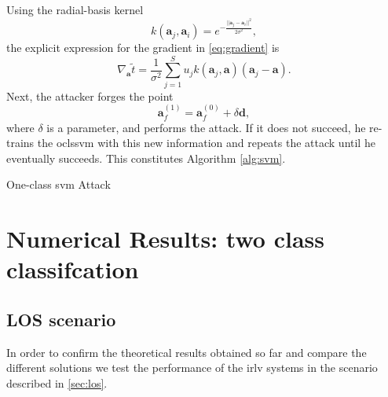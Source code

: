 \documentclass[draftcls,onecolumn,12pt]{IEEEtran}
\begin{document}
Using the radial-basis kernel
\begin{equation}
k(\mathbf{a}_j,\mathbf{a}_i) = e^{-\frac{||\mathbf{a}_j-\mathbf{a}_i||^2}{2\sigma^2}},
\end{equation}
the explicit expression for the gradient in \eqref{eq:gradient} is
\begin{equation}
	\nabla_{\mathbf{a}} \tilde{t} =\frac{1}{\sigma^2} \sum_{j=1}^{S} u_j k(\mathbf{a}_j,\mathbf{a}) (\mathbf{a}_j - \mathbf{a}).
\end{equation}
Next, the attacker forges the point
\begin{equation}
	\mathbf{a}_f^{(1)} = \mathbf{a}_f^{(0)} + \delta \mathbf{d}, 	
\end{equation}
where $\delta$ is a parameter, and performs the attack. If it does not succeed, he re-trains the \ac{oclssvm} with this new information and repeats the attack until he eventually succeeds. This constitutes Algorithm \ref{alg:svm}.

\begin{algorithm}[t]
\label{alg:svm}
  \scriptsize

 

    
 \caption{One-class \ac{svm} Attack}
\end{algorithm}


\section{Numerical Results: two class classifcation}

\subsection{LOS scenario}\label{sec:res_los}
In order to confirm the theoretical results obtained so far and compare the different solutions we test the performance of the \ac{irlv} systems in the scenario described in \ref{sec:los}.
\end{document}
